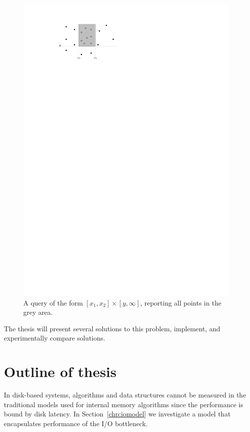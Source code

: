 \documentclass[twoside,11pt,openright]{report}
\begin{document}
\begin{figure}[h]
	\centering
	\includegraphics[scale=1]{../figures/three-sided-query}
	\caption{A query of the form $[x_1,x_2] \times [y,\infty]$, reporting all points in the grey area.}
	\label{fig:three-sided-query}
\end{figure}
 
The thesis will present several solutions to this problem, implement, and experimentally compare solutions.

\section{Outline of thesis}
In disk-based systems, algorithms and data structures cannot be measured in the traditional models used for internal memory algorithms since the performance is bound by disk latency. In Section~\ref{chp:iomodel} we investigate a model that encapsulates performance of the I/O bottleneck.
\end{document}

